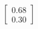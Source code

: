 \documentclass[preview]{standalone}
\begin{document}
\begin{align*}
\begin{bmatrix} 0.68 \\ 0.30 \end{bmatrix}
\end{align*}
\end{document}
